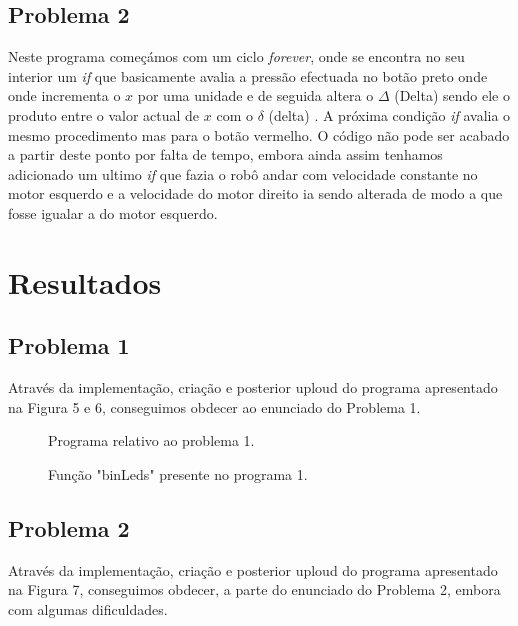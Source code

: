 \documentclass[a4paper, 12pt, onecolumn, oneside]{report}
\begin{document}
\newpage

\subsection{Problema 2}


Neste programa começámos com um ciclo \emph{forever}, onde se encontra no seu interior um \emph{if} que basicamente avalia a pressão efectuada no botão preto onde onde incrementa o $ x $ por uma unidade e de seguida altera o $\Delta$ (Delta) sendo ele o produto entre o valor actual de $x$ com o $\delta$ (delta) . A próxima condição \emph{if} avalia o mesmo procedimento mas para o botão vermelho. O código não pode ser acabado a partir deste ponto por falta de tempo, embora ainda assim tenhamos adicionado um ultimo \emph{if} que fazia o robô andar com velocidade constante no motor esquerdo e a velocidade do motor direito ia sendo alterada de modo a que fosse igualar a do motor esquerdo.



 \newpage
\section{Resultados}

\subsection{Problema 1}

Através da implementação, criação e posterior uploud do programa apresentado na Figura 5 e 6, conseguimos obdecer ao enunciado do Problema 1.

\begin{figure}[H]
\center{\texttt{[image: 1]}}
\caption{Programa relativo ao problema 1.}
\label{fig:speciation}
\end{figure}


\begin{figure}[H]
\center{\texttt{[image: f1]}}
\caption{Função "binLeds" presente no programa 1.}
\label{fig:speciation}
\end{figure}



\subsection{Problema 2}

Através da implementação, criação e posterior uploud do programa apresentado na Figura 7, conseguimos obdecer, a parte do enunciado do Problema 2, embora com algumas dificuldades. 
\end{document}
